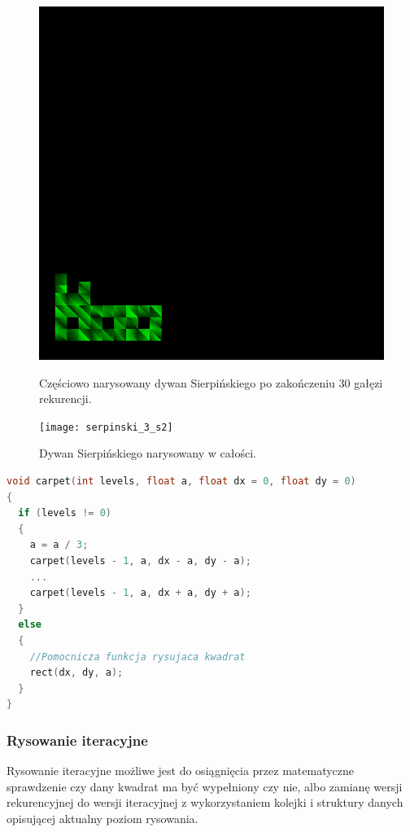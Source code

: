 \begin{figure}[H]
  \
  \begin{minipage}[t]{.45\linewidth}
      \includegraphics[width=\linewidth]{img/serpinski_3_s1.png}
      \caption{Częściowo narysowany dywan Sierpińskiego po zakończeniu 30 gałęzi rekurencji.}
  \end{minipage}
  \hspace{.05\linewidth}
  \begin{minipage}[t]{0.45\linewidth}
      \texttt{[image: serpinski\_3\_s2]}
      \caption{Dywan Sierpińskiego narysowany w całości.}
  \end{minipage}
\end{figure}

\begin{lstlisting}[language=C++, caption=Funkcja rysująca dywan Sierpińskiego rekurencyjnie. Pominięto niektóre wywołania.]
void carpet(int levels, float a, float dx = 0, float dy = 0)
{
  if (levels != 0)
  {
    a = a / 3;
    carpet(levels - 1, a, dx - a, dy - a);
    ...
    carpet(levels - 1, a, dx + a, dy + a);
  }
  else
  {
    //Pomocnicza funkcja rysujaca kwadrat
    rect(dx, dy, a); 
  }
}
\end{lstlisting}
\subsubsection{Rysowanie iteracyjne}
Rysowanie iteracyjne możliwe jest do osiągnięcia przez matematyczne sprawdzenie czy dany kwadrat ma być wypełniony czy nie, albo zamianę wersji rekurencyjnej do wersji iteracyjnej z wykorzystaniem kolejki i struktury danych opisującej aktualny poziom rysowania.

